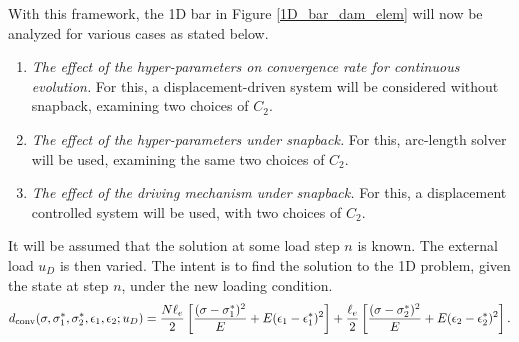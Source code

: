 \documentclass[10pt]{cas-sc}
\newenvironment{addedblock}
{\begingroup\color{blue!80}}
{\endgroup}
\begin{document}

With this framework, the 1D bar in Figure \ref{1D_bar_dam_elem} will now be analyzed for various cases as stated below. 
\begin{addedblock}
\begin{enumerate}
	\item\label{case:rate} \emph{The effect of the hyper-parameters on convergence rate for continuous evolution.} For this, a displacement-driven system will be considered without snapback, examining two choices of $C_2$.
	\item\label{case:necessity_metric} \emph{The effect of the hyper-parameters under snapback.} For this, arc-length solver will be used, examining the same two choices of $C_2$.
	\item\label{case:necessity_solver} \emph{The effect of the driving mechanism under snapback.} For this, a displacement controlled system will be used, with two choices of $C_2$.
\end{enumerate}
\end{addedblock}


It will be assumed that the solution at some load step $n$ is known. The external load $u_D$ is then varied. The intent is to find the solution to the 1D problem, given the state at step $n$, under the new loading condition. 
\begin{equation}
	d_{\rm conv}(\sigma,\sigma_1^*,\sigma_2^*,\epsilon_1,\epsilon_2;u_D) = \frac{N \ell_e}{2} \left[ \frac{(\sigma - \sigma_1^*)^2}{E} +  E(\epsilon_1 - \epsilon_1^*)^2 \right] + \frac{\ell_e}{2}  \left[ \frac{(\sigma - \sigma_2^*)^2}{E} +  E(\epsilon_2 - \epsilon_2^*)^2 \right]. \label{1D_short_dist_func_conv}
\end{equation}
	
\end{document}

